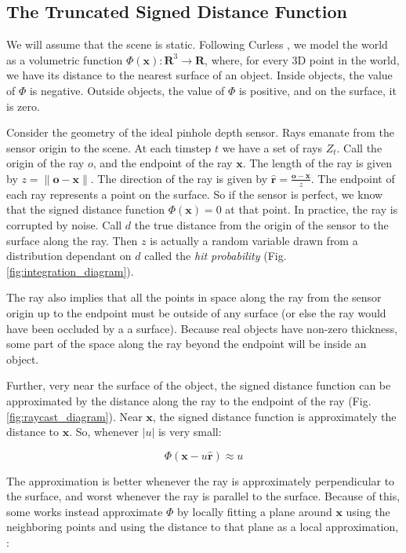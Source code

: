 \documentclass[10pt,twocolumn,letterpaper]{article}
\newcommand{\figref}[1]{Fig.\ref{#1}}
\begin{document}
\subsection{The Truncated Signed Distance Function}
\label{section:TSDF}
We will assume that the scene is static. Following Curless \cite{Curless1996},
we model the world as a volumetric function $\Phi(\mathbf{x}) : \mathbf{R}^3
\to \mathbf{R}$, where, for every 3D point in the world, we have its distance
to the nearest surface of an object. Inside objects, the value of $\Phi$ is
negative. Outside objects, the value of $\Phi$ is positive, and on the surface,
it is zero.

Consider the geometry of the ideal pinhole depth sensor. Rays emanate from the
sensor origin to the scene. At each timstep $t$ we have a set of rays
$Z_t$. Call the origin of the ray $o$, and the endpoint of the ray $\mathbf{x}$.
The length of the ray is given by $z = \|\mathbf{o}
- \mathbf{x}\|$. The direction of the ray is given by $\mathbf{\hat{r}} =
\frac{\mathbf{o} - \mathbf{x}}{z}$. The endpoint of each ray represents a point
on the surface. So if  the sensor is perfect, we know that the signed distance
function $\Phi(\mathbf{x}) = 0$ at that point. In practice, the ray is
corrupted by noise. Call $d$ the true distance from the origin of the sensor to
the surface along the ray. Then $z$ is actually a random variable drawn from a
distribution dependant on $d$ called the \textit{hit probability}
(\figref{fig:integration_diagram}).

The ray also implies that all the points in space along the ray from the sensor
origin up to the endpoint must be outside of any surface (or else the ray would
have been occluded by a a surface). Because real objects have non-zero
thickness, some part of the space along the ray beyond the endpoint will be
inside an object.

Further, very near the surface of the object, the signed distance function can
be approximated by the distance along the ray to the endpoint of  the ray
(\figref{fig:raycast_diagram}). Near $\mathbf{x}$, the signed distance function
is approximately the distance to $\mathbf{x}$. So, whenever $|u|$ is very
small:

\begin{equation} 
\label{eq:pointwise_tsdf} 
	\Phi(\mathbf{x} - u\mathbf{\hat{r}}) \approx u 
\end{equation}

The approximation is better whenever the ray is approximately
perpendicular to the surface, and worst whenever the ray is parallel to the
surface. Because of this, some works \cite{Bylow2013} instead approximate
$\Phi$ by locally fitting a plane around $\mathbf{x}$ using the neighboring
points and using the distance to that plane as a local approximation, \ie:
\end{document}
